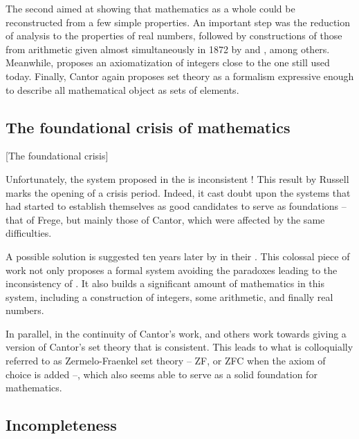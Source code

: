 The second aimed at showing that mathematics as a whole could be reconstructed from a
few simple properties. An important step was the reduction of analysis to the properties
of real numbers, followed by constructions of those from arithmetic given almost
simultaneously in 1872 by  and
, among others.
Meanwhile,  proposes an axiomatization of integers close to the
one still used today. Finally, Cantor again proposes set theory 
as a formalism expressive enough to describe all mathematical object as sets of elements.

\subsection{The foundational crisis of mathematics}[The foundational crisis]

Unfortunately, the system proposed in the  is inconsistent%
 !
This result by Russell%
%
marks the opening of a crisis period.
Indeed, it cast doubt upon the systems that had started to establish
themselves as good candidates to serve as foundations – that of Frege, but
mainly those of Cantor, which were affected by the same difficulties.

A possible solution is suggested ten years later  by \citeauthor{Whitehead1913} in their
 . This colossal piece of work
not only proposes a formal system avoiding the paradoxes leading to the inconsistency
of . It also builds a significant amount
of mathematics in this system, including a construction of integers,
some arithmetic, and finally real numbers.

In parallel, in the continuity of Cantor’s work,  and others
work towards giving a version of Cantor’s set theory that is consistent. This leads to what
is colloquially referred to as Zermelo-Fraenkel set theory – ZF, or ZFC when the
axiom of choice  is added –, which also seems able to serve as a
solid foundation for mathematics.

\subsection{Incompleteness}

